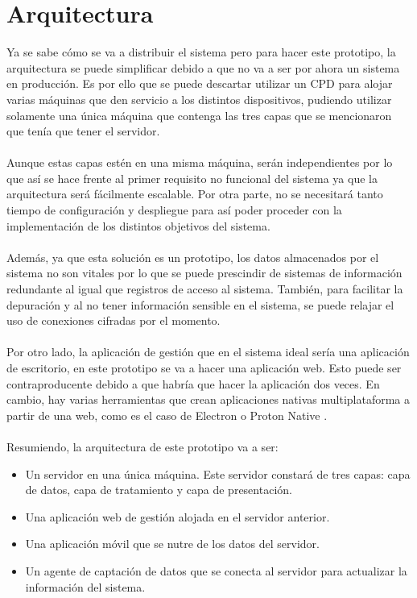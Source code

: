 \section{Arquitectura} \label{arquitectura-analisis}
Ya se sabe cómo se va a distribuir el sistema pero para hacer este prototipo, la arquitectura se puede simplificar debido a que no va a ser por ahora un sistema en producción. Es por ello que se puede descartar utilizar un CPD para alojar varias máquinas que den servicio a los distintos dispositivos, pudiendo utilizar solamente una única máquina que contenga las tres capas que se mencionaron que tenía que tener el servidor.
\\\\
Aunque estas capas estén en una misma máquina, serán independientes por lo que así se hace frente al primer requisito no funcional del sistema ya que la arquitectura será fácilmente escalable. Por otra parte, no se necesitará tanto tiempo de configuración y despliegue para así poder proceder con la implementación de los distintos objetivos del sistema.
\\\\
Además, ya que esta solución es un prototipo, los datos almacenados por el sistema no son vitales por lo que se puede prescindir de sistemas de información redundante al igual que registros de acceso al sistema. También, para facilitar la depuración y al no tener información sensible en el sistema, se puede relajar el uso de conexiones cifradas por el momento.
\\\\
Por otro lado, la aplicación de gestión que en el sistema ideal sería una aplicación de escritorio, en este prototipo se va a hacer una aplicación web. Esto puede ser contraproducente debido a que habría que hacer la aplicación dos veces. En cambio, hay varias herramientas que crean aplicaciones nativas multiplataforma a partir de una web, como es el caso de Electron \cite{electron} o Proton Native \cite{proton-native}.
\\\\
Resumiendo, la arquitectura de este prototipo va a ser:
\begin{itemize}
	\item Un servidor en una única máquina. Este servidor constará de tres capas: capa de datos, capa de tratamiento y capa de presentación.
	\item Una aplicación web de gestión alojada en el servidor anterior.
	\item Una aplicación móvil que se nutre de los datos del servidor.
	\item Un agente de captación de datos que se conecta al servidor para actualizar la información del sistema.
\end{itemize}

